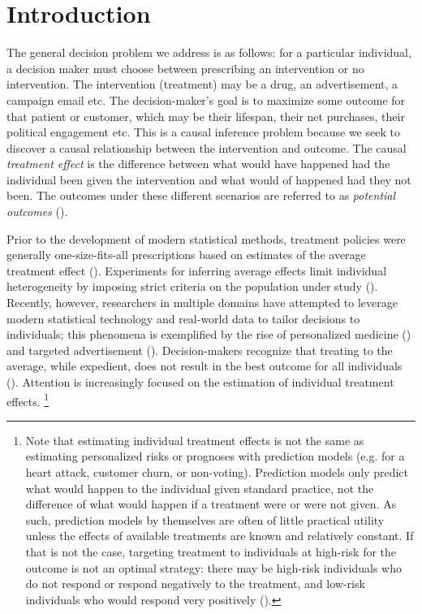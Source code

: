 \section{Introduction}

The general decision problem we address is as follows: for a particular individual, a decision maker must choose between prescribing an intervention or no intervention. The intervention (treatment) may be a drug, an advertisement, a campaign email etc. The decision-maker's goal is to maximize some outcome for that patient or customer, which may be their lifespan, their net purchases, their political engagement etc. This is a causal inference problem because we seek to discover a causal relationship between the intervention and outcome. The causal \emph{treatment effect} is the difference between what would have happened had the individual been given the intervention and what would of happened had they not been. The outcomes under these different scenarios are referred to as \emph{potential outcomes} (\citealp{Rubin2005}).

Prior to the development of modern statistical methods, treatment policies were generally one-size-fits-all prescriptions based on estimates of the average treatment effect (\citealp{Segal:ub}). Experiments for inferring average effects limit individual heterogeneity by imposing strict criteria on the population under study (\citealp{Stuart:2014id}). Recently, however, researchers in multiple domains have attempted to leverage modern statistical technology and real-world data to tailor decisions to individuals; this phenomena is exemplified by the rise of personalized medicine (\citealp{Ferreira:2017fv}) and targeted advertisement (\citealp{Ascarza:2018ie, Matz:2017ix}). Decision-makers recognize that treating to the average, while expedient, does not result in the best outcome for all individuals (\citealp{Kravitz:2004fa,Segal:ub}). Attention is increasingly focused on the estimation of individual treatment effects.
\footnote{Note that estimating individual treatment effects is not the same as estimating personalized risks or prognoses with prediction models (e.g. for a heart attack, customer churn, or non-voting). Prediction models only predict what would happen to the individual given standard practice, not the difference of what would happen if a treatment were or were not given. As such, prediction models by themselves are often of little practical utility unless the effects of available treatments are known and relatively constant. If that is not the case, targeting treatment to individuals at high-risk for the outcome is not an optimal strategy: there may be high-risk individuals who do not respond or respond negatively to the treatment, and low-risk individuals who would respond very positively (\citealp{Ascarza:2018ie}).}

